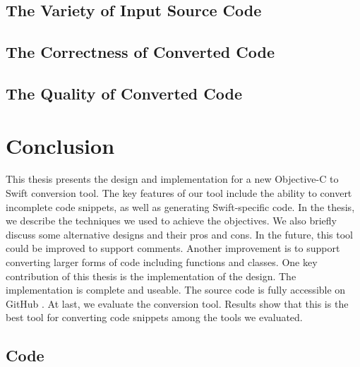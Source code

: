 \documentclass{sfuthesis}
\begin{document}
\section{The Variety of Input Source Code}

\section{The Correctness of Converted Code}

\section{The Quality of Converted Code}

\chapter{Conclusion}

This thesis presents the design and implementation for a new Objective-C to Swift conversion tool. The key features of our tool include the ability to convert incomplete code snippets, as well as generating Swift-specific code. In the thesis, we describe the techniques we used to achieve the objectives. We also briefly discuss some alternative designs and their pros and cons. In the future, this tool could be improved to support comments. Another improvement is to support converting larger forms of code including functions and classes.
One key contribution of this thesis is the implementation of the design. The implementation is complete and useable. The source code is fully accessible on GitHub \cite{babelswift}. At last, we evaluate the conversion tool. Results show that this is the best tool for converting code snippets among the tools we evaluated.


%
%
%
%
%

\backmatter%
	
	

\begin{appendices} %
	\chapter{Code}
\end{appendices}
\end{document}
